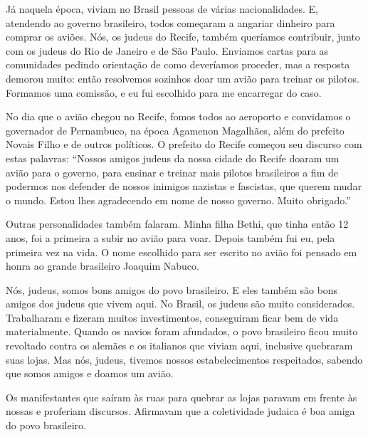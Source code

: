 Já naquela época, viviam no Brasil pessoas de várias nacionalidades. E,
atendendo ao governo brasileiro, todos começaram a angariar dinheiro para
comprar os aviões. Nós, os judeus do Recife, também queríamos
contribuir, junto com os judeus do Rio de Janeiro e de São Paulo.
Enviamos cartas para as comunidades pedindo orientação de como
deveríamos proceder, mas a resposta demorou muito: então resolvemos
sozinhos doar um avião para treinar os pilotos. Formamos uma comissão, e
eu fui escolhido para me encarregar do caso.

No dia que o avião chegou no Recife, fomos todos ao aeroporto e
convidamos o governador de Pernambuco, na época Agamenon Magalhães, além do
prefeito Novais Filho e de outros políticos. O prefeito do
Recife começou seu discurso com estas palavras: ``Nossos amigos judeus
da nossa cidade do Recife doaram um avião para o governo, para
ensinar e treinar mais pilotos brasileiros a fim de podermos nos defender
de nossos inimigos nazistas e fascistas, que querem mudar o
mundo. Estou lhes agradecendo em nome de nosso governo. Muito obrigado.''

Outras personalidades também falaram. Minha filha Bethi, que tinha
então 12 anos, foi a primeira a subir no avião para voar. Depois também fui eu, pela primeira vez na vida. O nome escolhido para ser escrito no avião foi pensado em honra ao grande brasileiro Joaquim Nabuco.

Nós, judeus, somos bons amigos do povo brasileiro. E eles também são bons
amigos dos judeus que vivem aqui. No Brasil, os judeus são muito
considerados. Trabalharam e fizeram muitos investimentos, conseguiram ficar bem de vida materialmente. Quando os navios foram afundados, o povo brasileiro ficou muito revoltado contra os alemães e
os italianos que viviam aqui, inclusive quebraram suas lojas. Mas nós, judeus,
tivemos nossos estabelecimentos respeitados, sabendo que somos amigos e
doamos um avião.

Os manifestantes que saíram às ruas para quebrar as lojas paravam em
frente às nossas e proferiam discursos. Afirmavam que a
coletividade judaica é boa amiga do povo brasileiro.

